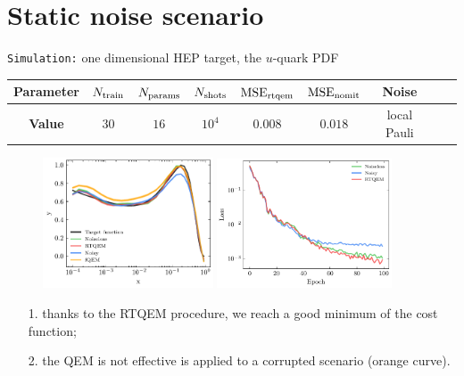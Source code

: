 \documentclass[8pt, xcolor={svgnames}, hyperref={linkcolor=black}, aspectratio=169]{beamer}
\begin{document}
\section{Static noise scenario}

\begin{frame}{\texttt{Simulation:} one dimensional HEP target, the $u$-quark PDF}

\begin{center}
\footnotesize
\begin{tabular}{ccccccccc}
\hline \hline 
\rule{0pt}{2.5ex}
\textbf{Parameter} & $N_{\rm train}$ & $N_{\rm params}$ & $N_{\rm shots}$ 
& $\text{MSE}_{\rm rtqem}$ &  $\text{MSE}_{\rm nomit}$ & Noise \\
\hline
\rule{0pt}{2.5ex}
\textbf{Value} & $30$ & $16$ & $10^{4}$ &  $0.008$ & $0.018$ & local Pauli \\
\hline \hline 
\end{tabular}
\end{center}

\begin{figure}
    \includegraphics[width=0.45\textwidth]{figures/qpdf.pdf}%
    \includegraphics[width=0.46\textwidth]{figures/qpdf_loss.pdf}
\end{figure}
\begin{itemize}[noitemsep]
\item[1.] thanks to the RTQEM procedure, we reach a good minimum of the cost function;
\item[2.] the QEM is not effective is applied to a corrupted scenario (orange curve).
\end{itemize}
\end{frame}
\end{document}
